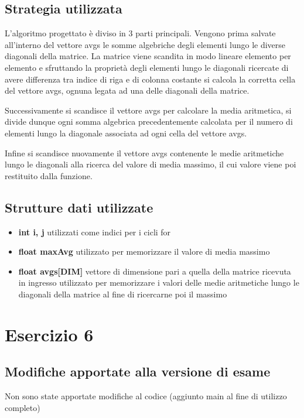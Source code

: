 \documentclass[11pt, a4paper, titlepage]{article}
\begin{document}
        \subsection{Strategia utilizzata}
            L'algoritmo progettato è diviso in 3 parti principali. Vengono prima salvate all'interno del vettore avgs
            le somme algebriche degli elementi lungo le diverse diagonali della matrice. La matrice viene scandita in
            modo lineare elemento per elemento e sfruttando la proprietà degli elementi lungo le diagonali ricercate di
            avere differenza tra indice di riga e di colonna costante si calcola la corretta cella del vettore avgs, ognuna
            legata ad una delle diagonali della matrice.

            Successivamente si scandisce il vettore avgs per calcolare la media aritmetica, si divide dunque ogni somma algebrica
            precedentemente calcolata per il numero di elementi lungo la diagonale associata ad ogni cella del vettore avgs.

            Infine si scandisce nuovamente il vettore avgs contenente le medie aritmetiche lungo le diagonali alla ricerca
            del valore di media massimo, il cui valore viene poi restituito dalla funzione.

        \subsection{Strutture dati utilizzate}
            \begin{itemize}
                \item \textbf{int i, j} utilizzati come indici per i cicli for
                \item \textbf{float maxAvg} utilizzato per memorizzare il valore di media massimo
                \item \textbf{float avgs[DIM]} vettore di dimensione pari a quella della matrice ricevuta in ingresso
                utilizzato per memorizzare i valori delle medie aritmetiche lungo le diagonali della matrice al fine di
                ricercarne poi il massimo
            \end{itemize}

    \section{Esercizio 6}

        \subsection{Modifiche apportate alla versione di esame}
            Non sono state apportate modifiche al codice (aggiunto main al fine di utilizzo completo)
\end{document}
